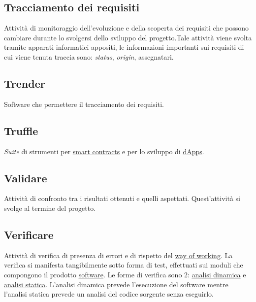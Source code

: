 	\subsection{Tracciamento dei requisiti}
	\label{sec:tracciamentorequisiti}
	Attività di monitoraggio dell'evoluzione e della scoperta dei requisiti che possono cambiare durante lo svolgersi dello sviluppo del progetto.Tale attività viene svolta tramite apparati informatici appositi, le informazioni importanti sui requisiti di cui viene tenuta traccia sono: \emph{status}, \emph{origin}, assegnatari.

	\subsection{Trender}
	\label{sec:trender}
	Software che permettere il tracciamento dei requisiti.
	
	\subsection{Truffle}
	\label{sec:truffle}
	\emph{Suite} di strumenti per \underline{\hyperref[sec:smartcontracts]{smart contracts}} e per lo sviluppo di \underline{\hyperref[sec:dapps]{dApps}}.

	\newpage

	\subsection{Validare}
	\label{sec:validare}
	Attività di confronto tra i risultati ottenuti e quelli aspettati. Quest'attività si svolge al termine del progetto.

	\subsection{Verificare}
	\label{sec:verificare}
	Attività di verifica di presenza di errori e di rispetto del \underline{\hyperref[sec:wow]{way of working}}. La verifica si manifesta tangibilmente sotto forma di test, effettuati sui moduli che compongono il prodotto \underline{\hyperref[sec:prodottosoftware]{software}}. Le forme di verifica sono 2: \hyperref[sec:analisidinamica]{\underline{analisi dinamica}} e \hyperref[sec:analisistatica]{\underline{analisi statica}}. L'analisi dinamica prevede l'esecuzione del software mentre l'analisi statica prevede un analisi del codice sorgente senza eseguirlo.

